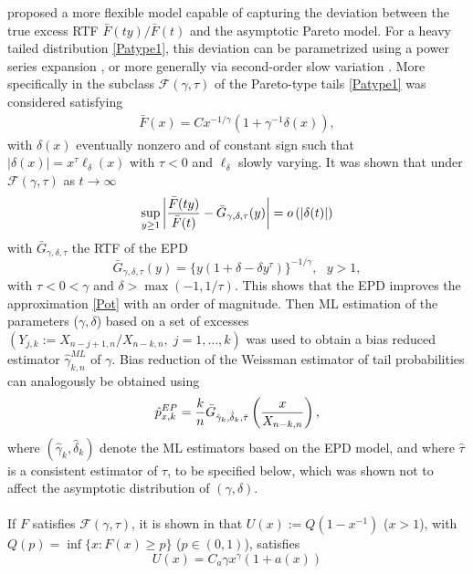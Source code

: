 \cite{beirlant2009second} proposed a more flexible model capable of capturing the deviation between the true excess RTF $\bar{F}(ty)/\bar{F}(t)$ and the asymptotic Pareto model. For a heavy tailed distribution \eqref{Patype1}, this deviation can be parametrized using a power series expansion \citep{hall}, or more generally via second-order slow variation \citep{bingham1987regular}. 
More specifically in \cite{beirlant2009second} the subclass $\mathcal{F}(\gamma,\tau)$ of the Pareto-type tails \eqref{Patype1} was considered satisfying
\begin{eqnarray}
\bar{F}(x) = C x^{-1/\gamma}\left( 1+\gamma^{-1}\delta (x)\right),
\label{Sclass}
\end{eqnarray}
with $\delta (x)$ eventually nonzero and of constant sign such that $|\delta(x)|=x^\tau \ell_{\delta}(x)$ with $\tau <0$ and $\ell_{\delta}$ slowly varying. 
It was shown that under $\mathcal{F}(\gamma,\tau)$ as $t \to \infty$
$$
\sup_{y \geq 1}\left|{\bar{F}(ty)\over \bar{F}(t)} - \bar{G}_{\gamma,\delta,\tau}(y) \right|
= o\left(|\delta (t)| \right)
$$
with $\bar{G}_{\gamma,\delta,\tau}$ the RTF of the EPD
\begin{equation}
\bar{G}_{\gamma,\delta,\tau}(y)=\{y(1+\delta-\delta y^{\tau})\}^{-1/\gamma}, \ \ \ y>1,
\label{EPD}
\end{equation}
with $\tau <0 < \gamma$ and $\delta > \max (-1,1/\tau)$.
This shows that the EPD improves the approximation \eqref{Pot} with an order of magnitude.
Then ML estimation of the parameters ($\gamma,\delta$) based on a set of excesses 
$\left(Y_{j,k}:=X_{n-j+1,n}/X_{n-k,n},\; j=1,\ldots,k \right)$ was used to obtain a bias reduced estimator $\hat{\gamma}^{ML}_{k,n}$ of $\gamma$. Bias reduction of the Weissman estimator of tail probabilities can analogously be obtained using 
\begin{equation}
\hat{p}^{EP}_{x,k} = {k \over n}\bar{G}_{\hat\gamma _k,\hat\delta _k,\hat\tau}\left( {x \over X_{n-k,n}}\right),
\label{PEP}
\end{equation}
where $(\hat\gamma _k,\hat\delta _k)$ denote the ML estimators based on the EPD model, and where $\hat\tau$ is a consistent estimator of $\tau$, to be specified below, which was shown not to affect the asymptotic distribution of $(\gamma,\delta)$.
\\\\
If $F$ satisfies $\mathcal{F}(\gamma,\tau)$, it is shown in \cite{beirlant2009second} that $U(x):= Q(1-x^{-1})$ ($x>1$), with 
$Q(p) = \inf \{x: F(x) \geq p \}$ ($p \in (0,1)$), satisfies
\begin{equation}
U(x) = C_a{\gamma} x^{\gamma}\left(1+ a(x) \right)
\label{Q}
\end{equation}
